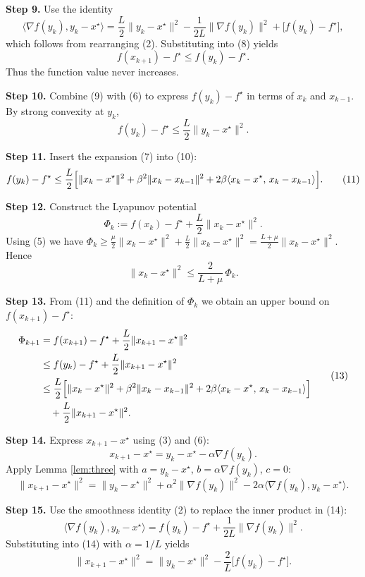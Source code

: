 \documentclass{article}
\newcommand{\grad}{\nabla}
\begin{document}
\noindent\textbf{Step 9.}  Use the identity
\[
\langle\grad f(y_k),y_k-x^\star\rangle = \frac{L}{2}\|y_k-x^\star\|^2 -\frac{1}{2L}\|\grad f(y_k)\|^2
+ \bigl[f(y_k)-f^\star\bigr] ,
\]
which follows from rearranging (2). Substituting into (8) yields
\[
f(x_{k+1})-f^\star \le f(y_k)-f^\star . \tag{9}
\]
Thus the function value never increases.

\noindent\textbf{Step 10.}  Combine (9) with (6) to express $f(y_k)-f^\star$ in terms of $x_k$ and $x_{k-1}$. By strong convexity at $y_k$,
\[
f(y_k)-f^\star \le \frac{L}{2}\|y_k-x^\star\|^2 . \tag{10}
\]

\noindent\textbf{Step 11.}  Insert the expansion (7) into (10):
\[
f(y_k)-f^\star \le \frac{L}{2}\Bigl[ \|x_k-x^\star\|^2 +\beta^2\|x_k-x_{k-1}\|^2
+2\beta\langle x_k-x^\star,\,x_k-x_{k-1}\rangle \Bigr]. \tag{11}
\]

\noindent\textbf{Step 12.}  Construct the Lyapunov potential
\[
\Phi_k:= f(x_k)-f^\star + \frac{L}{2}\|x_k-x^\star\|^2 .
\]
Using (5) we have $\Phi_k\ge \frac{\mu}{2}\|x_k-x^\star\|^2 +\frac{L}{2}\|x_k-x^\star\|^2
= \frac{L+\mu}{2}\|x_k-x^\star\|^2$. Hence
\[
\|x_k-x^\star\|^2 \le \frac{2}{L+\mu}\,\Phi_k . \tag{12}
\]

\noindent\textbf{Step 13.}  From (11) and the definition of $\Phi_k$ we obtain an upper bound on $f(x_{k+1})-f^\star$:
\[
\begin{aligned}
\Phi_{k+1}
&= f(x_{k+1})-f^\star +\frac{L}{2}\|x_{k+1}-x^\star\|^2\\
&\le f(y_k)-f^\star +\frac{L}{2}\|x_{k+1}-x^\star\|^2 \\
&\le \frac{L}{2}\Bigl[ \|x_k-x^\star\|^2 +\beta^2\|x_k-x_{k-1}\|^2
+2\beta\langle x_k-x^\star,\,x_k-x_{k-1}\rangle\Bigr] \\
&\quad +\frac{L}{2}\|x_{k+1}-x^\star\|^2 .
\end{aligned}
\tag{13}
\]

\noindent\textbf{Step 14.}  Express $x_{k+1}-x^\star$ using (3) and (6):
\[
x_{k+1}-x^\star = y_k-x^\star -\alpha\grad f(y_k) .
\]
Apply Lemma \ref{lem:three} with $a=y_k-x^\star$, $b=\alpha\grad f(y_k)$, $c=0$:
\[
\|x_{k+1}-x^\star\|^2 = \|y_k-x^\star\|^2 +\alpha^2\|\grad f(y_k)\|^2 -2\alpha\langle\grad f(y_k),y_k-x^\star\rangle . \tag{14}
\]

\noindent\textbf{Step 15.}  Use the smoothness identity (2) to replace the inner product in (14):
\[
\langle\grad f(y_k),y_k-x^\star\rangle = f(y_k)-f^\star +\frac{1}{2L}\|\grad f(y_k)\|^2 .
\]
Substituting into (14) with $\alpha=1/L$ yields
\[
\|x_{k+1}-x^\star\|^2 = \|y_k-x^\star\|^2 -\frac{2}{L}\bigl[f(y_k)-f^\star\bigr] . \tag{15}
\]
\end{document}
